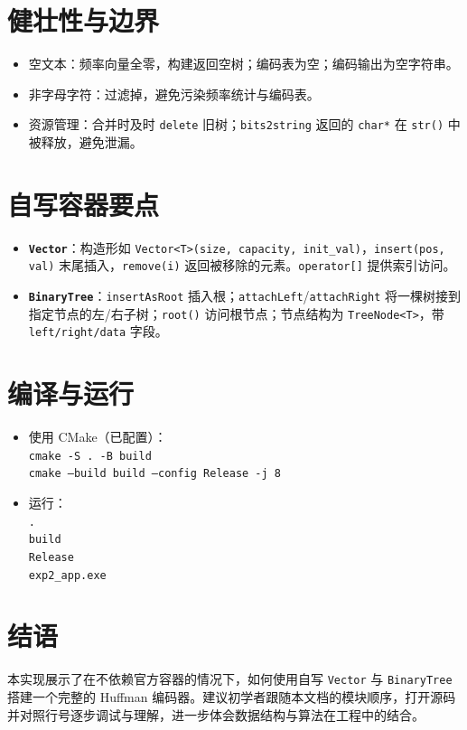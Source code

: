\documentclass[12pt]{article}
\begin{document}
\section{健壮性与边界}
\begin{itemize}[leftmargin=1.4em]
  \item 空文本：频率向量全零，构建返回空树；编码表为空；编码输出为空字符串。
  \item 非字母字符：过滤掉，避免污染频率统计与编码表。
  \item 资源管理：合并时及时 \texttt{delete} 旧树；\texttt{bits2string} 返回的 \texttt{char*} 在 \texttt{str()} 中被释放，避免泄漏。
\end{itemize}

\section{自写容器要点}
\begin{itemize}[leftmargin=1.4em]
  \item \textbf{\texttt{Vector}}：构造形如 \texttt{Vector<T>(size, capacity, init\_val)}，\texttt{insert(pos, val)} 末尾插入，\texttt{remove(i)} 返回被移除的元素。\texttt{operator[]} 提供索引访问。
  \item \textbf{\texttt{BinaryTree}}：\texttt{insertAsRoot} 插入根；\texttt{attachLeft}/\texttt{attachRight} 将一棵树接到指定节点的左/右子树；\texttt{root()} 访问根节点；节点结构为 \texttt{TreeNode<T>}，带 \texttt{left/right/data} 字段。
\end{itemize}

\section{编译与运行}
\begin{itemize}[leftmargin=1.4em]
  \item 使用 CMake（已配置）：\\
  \texttt{cmake -S . -B build}\\
  \texttt{cmake --build build --config Release -j 8}
  \item 运行：\\
  \texttt{.\\build\\Release\\exp2\_app.exe}
\end{itemize}

\section*{结语}
本实现展示了在不依赖官方容器的情况下，如何使用自写 \texttt{Vector} 与 \texttt{BinaryTree} 搭建一个完整的 Huffman 编码器。建议初学者跟随本文档的模块顺序，打开源码并对照行号逐步调试与理解，进一步体会数据结构与算法在工程中的结合。
\end{document}
